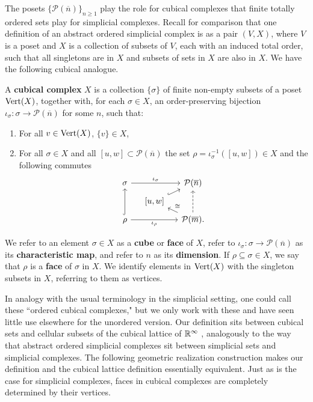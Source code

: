 The posets $\{\mathcal P(\overline n)\}_{n \geq 1}$ play the role for cubical complexes that finite totally ordered sets play for simplicial complexes.
Recall for comparison that one definition of an abstract ordered simplicial complex is as a pair $(V, X)$, where $V$ is a poset and $X$ is a collection of subsets of $V$, each with an induced total order, such that all singletons are in $X$ and subsets of sets in $X$ are also in $X$.
We have the following cubical analogue.

\begin{definition}\label{D:cubical}
	A \textbf{cubical complex} $X$ is a collection $\{ \sigma \}$ of finite non-empty subsets of a poset
	${\rm Vert}(X)$, together with, for each $\sigma \in X$, an order-preserving bijection $\iota_\sigma \colon \sigma \to \mathcal P(\overline n)$ for some $n$, such that:
	\begin{enumerate}
		\item For all $v \in {\rm Vert}(X)$, $\{v\} \in X$,
		\item For all $\sigma \in X$ and all $[u,w] \subset \mathcal P(\overline n)$ the set $\rho = \iota_\sigma^{-1}([u,w]) \in X$ and the following commutes
		\begin{equation*}
		\begin{tikzcd} [row sep = tiny, column sep = small]
		\sigma \arrow[rr, "\iota_\sigma"] && \mathcal P(\overline n) \\
		& [-5pt] {[}u,w{]} \arrow[ur, hook] & \\
		\rho \arrow[uu, hook] \arrow[rr, "\iota_\rho"'] && \mathcal P(\overline m). \arrow[ul, "\cong"'] \arrow[uu, dashed]
		\end{tikzcd}
		\end{equation*}
	\end{enumerate}
	We refer to an element $\sigma \in X$ as a \textbf{cube} or \textbf{face} of $X$, refer to $\iota_\sigma \colon \sigma \to \mathcal P(\overline{n})$ as its \textbf{characteristic map},
	and refer to $n$ as its \textbf{dimension}. If $\rho \subseteq \sigma \in X$, we say that $\rho$ is a \textbf{face} of $\sigma$ in $X$.
	We identify elements in ${\rm Vert}(X)$ with the singleton subsets in $X$, referring to them as vertices.
\end{definition}





In analogy with the usual terminology in the simplicial setting, one could call these ``ordered cubical complexes," but we only work with these and have seen little use elsewhere for the unordered version.
Our definition sits between cubical sets \cite{jardine2002cubical} and cellular subsets of the cubical lattice of $\mathbb{R}^\infty$ \cite{kaczynski2006computational}, analogously to the way that abstract ordered simplicial complexes sit between simplicial sets and simplicial complexes.
The following geometric realization construction makes our definition and the cubical lattice definition essentially equivalent. Just as is the case for simplicial complexes, faces in cubical complexes are completely determined by their vertices.

